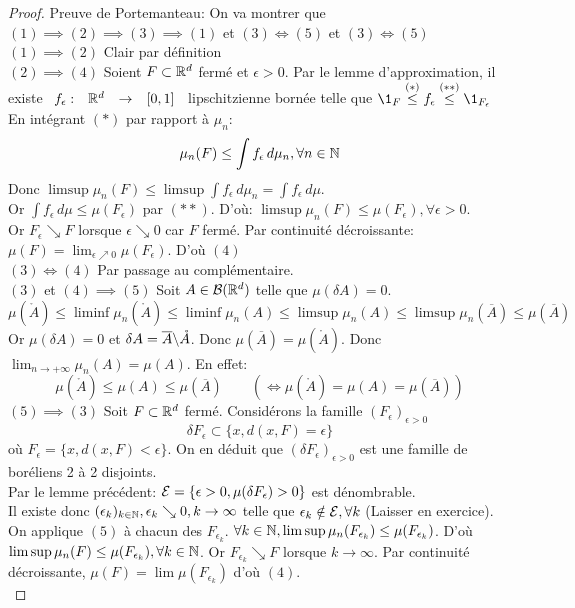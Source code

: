 \documentclass[]{report}
\begin{document}
    \begin{proof}
        Preuve de Portemanteau: On va montrer que $(1)\implies(2)\implies(3)\implies (1)$ et $(3)\iff (5)$ et $(3)\iff (5)$\\
        $(1)\implies (2)$ Clair par définition\\
        $(2)\implies (4)$ Soient $F\subset \mathbb{R}^d$ fermé et $\epsilon>0$. Par le lemme d'approximation, il existe $\begin{array}{ccccc} f_\epsilon : & \mathbb{R}^d & \to & [0,1] \end{array}$ lipschitzienne bornée telle que $\1_F\overset{(*)}{\le}f_\epsilon\overset{(**)}{\le }\1_{F_\epsilon}$\\
        En intégrant $(*)$ par rapport à $\mu_n$:
        \[\mu_n(F)\le \int f_\epsilon \,d\mu_n,\forall n\in \mathbb{N}\]
        Donc $\limsup \mu_n(F)\le \limsup \int f_\epsilon\,d\mu_n=\int f_\epsilon\,d\mu$.\\
        Or $\int f_\epsilon \,d\mu \le \mu(F_\epsilon)$ par $(**)$. D'où: $\limsup \mu_n(F)\le \mu(F_\epsilon),\forall \epsilon>0$.\\
        Or $F_\epsilon\searrow F$ lorsque $\epsilon \searrow 0$ car $F$ fermé. Par continuité décroissante: $\mu(F)=\lim_{\epsilon\nearrow 0}\mu(F_\epsilon)$. D'où $(4)$\\
        $(3)\iff (4)$ Par passage au complémentaire.\\
        $(3)$ et $(4) \implies (5)$ Soit $A\in \mathcal{B}(\mathbb{R}^d)$ telle que $\mu(\delta A)=0$.
        \[\mu(\mathring{A})\le \liminf \mu_n(\mathring{A})\le \liminf \mu_n(A)\le \limsup \mu_n (A)\le \limsup \mu_n(\overline{A})\le \mu(\overline{A})\]
        Or $\mu(\delta A)=0$ et $\delta A=\overline{A}\backslash \mathring{A}$. Donc $\mu(\overline{A})=\mu(\mathring{A})$. Donc $\lim_{n\to +\infty}\mu_n (A)=\mu(A)$. En effet:
        \[\mu(\mathring{A})\le \mu(A)\le \mu(\overline{A})\qquad \left(\iff \mu(\mathring{A})=\mu(A)=\mu(\overline{A})\right)\]
        $(5)\implies (3)$ Soit $F\subset \mathbb{R}^d$ fermé. Considérons la famille $(F_\epsilon)_{\epsilon>0}$
        \[\delta F_\epsilon \subset \{x,d(x,F)=\epsilon\}\]
        où $F_\epsilon=\{x,d(x,F)<\epsilon\}$. On en déduit que $(\delta F_\epsilon)_{\epsilon>0}$ est une famille de boréliens 2 à 2 disjoints.\\
        Par le lemme précédent: $\mathcal{E}=\{\epsilon>0,\mu(\delta F_\epsilon)>0\}$ est dénombrable.\\
        Il existe donc $(\epsilon_k)_{k\in \mathbb{N}},\epsilon_k\searrow 0, k\to \infty$ telle que $\epsilon_k\notin \mathcal{E},\forall k$ (Laisser en exercice).\\
        On applique $(5)$ à chacun des $F_{\epsilon_k}$. $\forall k\in \mathbb{N},\limsup \mu_n(F_{\epsilon_k})\le \mu(F_{\epsilon_k})$. D'où $\limsup \mu_n(F)\le \mu(F_{\epsilon_k}),\forall k\in \mathbb{N}$. Or $F_{\epsilon_k}\searrow F$ lorsque $k\to \infty$. Par continuité décroissante, $\mu(F)=\lim \mu(F_{\epsilon_k})$ d'où $(4)$.\\

\end{proof}
\end{document}
